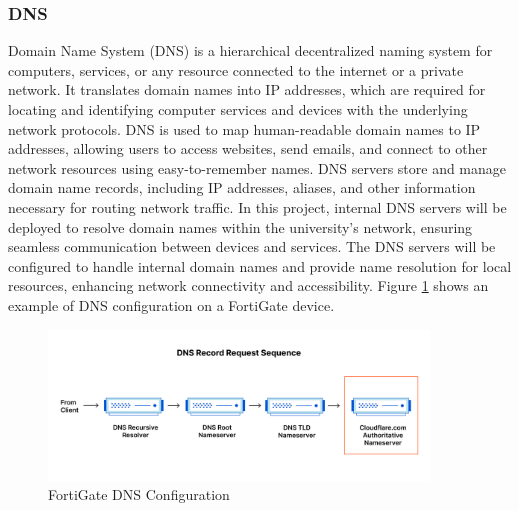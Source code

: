 \documentclass[12pt]{report}
\begin{document}
\subsubsection{DNS}
Domain Name System (DNS) is a hierarchical decentralized naming system for computers, services, or any resource connected to the internet or a private network. It translates domain names into IP addresses, which are required for locating and identifying computer services and devices with the underlying network protocols. DNS is used to map human-readable domain names to IP addresses, allowing users to access websites, send emails, and connect to other network resources using easy-to-remember names. DNS servers store and manage domain name records, including IP addresses, aliases, and other information necessary for routing network traffic. In this project, internal DNS servers will be deployed to resolve domain names within the university's network, ensuring seamless communication between devices and services. The DNS servers will be configured to handle internal domain names and provide name resolution for local resources, enhancing network connectivity and accessibility. \cite{DNS}
Figure \ref{fig:DNS} shows an example of DNS configuration on a FortiGate device.
\begin{figure}[h]
    \centering
    \includegraphics[width=0.9\textwidth]{images/dns.png}
    \caption{FortiGate DNS Configuration \cite{DNSIMG}}
    \label{fig:DNS}
\end{figure}
\end{document}
